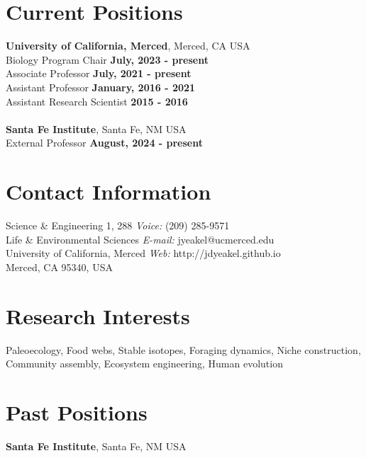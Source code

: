 \documentclass[margin,line,12pt]{res}
\begin{document}

\begin{resume}

\section{\sc Current Positions}
{\bf University of California, Merced}, Merced, CA USA\\
Biology Program Chair \hfill {\bf July, 2023 - present} \\
Associate Professor \hfill {\bf July, 2021 - present} \\
Assistant Professor \hfill {\bf January, 2016 - 2021} \\
Assistant Research Scientist \hfill {\bf 2015 - 2016}\\ \\
{\bf Santa Fe Institute}, Santa Fe,  NM USA\\
External Professor \hfill {\bf August, 2024 - present}

\section{\sc Contact Information}
Science \& Engineering 1, 288             \hfill {\it Voice:}  (209) 285-9571 \\
Life \& Environmental Sciences   \hfill {\it E-mail:}  jyeakel@ucmerced.edu \\
University of California, Merced  \hfill {\it Web:} http://jdyeakel.github.io\\
Merced, CA 95340, USA  \hfill  \\


\section{\sc Research Interests}
Paleoecology,
Food webs,
Stable isotopes,
Foraging dynamics,
Niche construction,
Community assembly,
Ecosystem engineering,
Human evolution

\section{\sc Past Positions}
{\bf Santa Fe Institute}, Santa Fe, NM USA


\end{resume}
\end{document}
